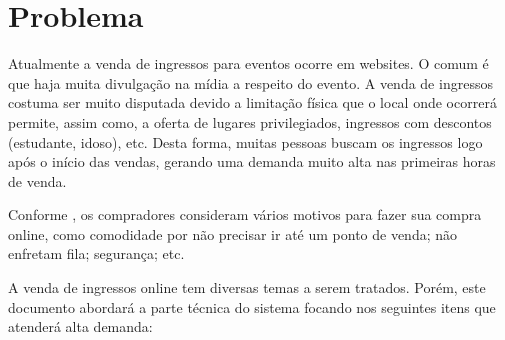 \chapter{Problema}

Atualmente a venda de ingressos para eventos ocorre em websites.
O comum é que haja muita divulgação na mídia a respeito do evento.
A venda de ingressos costuma ser muito disputada devido a limitação
física que o local onde ocorrerá permite, assim como, a oferta de
lugares privilegiados, ingressos com descontos (estudante, idoso), etc.
Desta forma, muitas pessoas buscam os ingressos logo após o início das
vendas, gerando uma demanda muito alta nas primeiras horas de venda.

Conforme \cite{10-motivos-para-vender-online}, os compradores consideram
vários motivos para fazer sua compra online, como comodidade por não
precisar ir até um ponto de venda; não enfretam fila; segurança; etc.

A venda de ingressos online
tem diversas temas a serem tratados. Porém, este documento abordará a parte
técnica do sistema focando nos seguintes itens que atenderá alta demanda:

